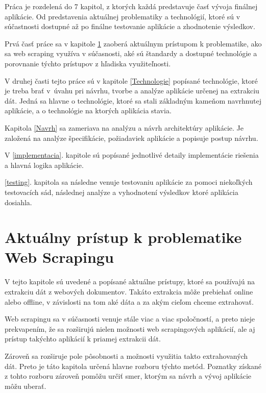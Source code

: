 \newpage

Práca je rozdelená do 7 kapitol, z ktorých každá predstavuje časť vývoja finálnej aplikácie. Od predstavenia aktuálnej problematiky a technológií, ktoré sú v súčastnosti dostupné až po finálne testovanie aplikácie a zhodnotenie výsledkov.

\bigskip

Prvá časť práce sa v kapitole \ref{aktualny_pristup} zaoberá aktuálnym prístupom k problematike, ako sa web scraping využíva v súčasnosti, aké sú štandardy a dostupné technológie a porovnanie týchto prístupov z hľadiska využiteľnosti.

V druhej časti tejto práce sú v kapitole \ref{Technologie} popísané technológie, ktoré je treba brať \mbox{v úvahu} pri návrhu, tvorbe a analýze aplikácie určenej na extrakciu dát. Jedná sa hlavne o technológie, ktoré sa stali základným kameňom navrhnutej aplikácie, a o technológie na ktorých aplikácia stavia.

Kapitola \ref{Navrh} sa zameriava na analýzu a návrh architektúry aplikácie. Je založená na analýze špecifikácie, požiadaviek aplikácie a popisuje postup návrhu.

V \ref{implementacia}. kapitole sú popísané jednotlivé detaily implementácie riešenia a hlavná logika aplikácie.

\ref{testing}. kapitola sa následne venuje testovaniu aplikácie za pomoci niekoľkých testovacích sád, následnej analýze a vyhodnotení výsledkov ktoré aplikácia dosiahla.


\chapter{Aktuálny prístup k problematike Web Scrapingu}
\label{aktualny_pristup}

V tejto kapitole sú uvedené a popísané aktuálne prístupy, ktoré sa používajú na extrakciu dát z webových dokumentov. Takáto extrakcia môže prebiehať online alebo offline, v závislosti na tom aké dáta a za akým cieľom chceme extrahovať.

Web scrapingu sa v súčasnosti venuje stále viac a viac spoločností, a preto nieje prekvapením, že sa rozširujú nielen možnosti web scrapingových aplikácií, ale aj prístup takýchto aplikácií k priamej extrakcii dát.

Zároveň sa rozširuje pole pôsobnosti a možnosti využitia takto extrahovaných dát. Preto je táto kapitola určená hlavne rozboru týchto metód. Poznatky získané z tohto rozboru zároveň pomôžu určiť smer, ktorým sa návrh a vývoj aplikácie môžu uberať. 


